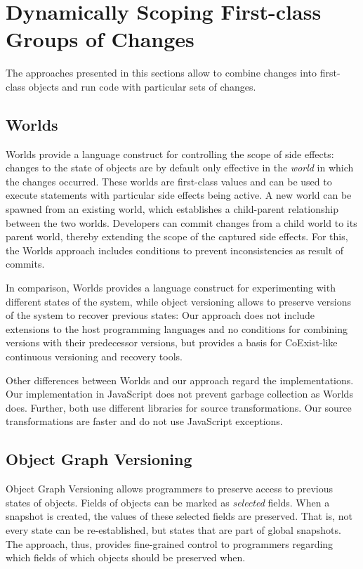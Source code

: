 \section{Dynamically Scoping First-class Groups of Changes}

The approaches presented in this sections allow to combine changes into first-class objects and run code with particular sets of changes.


\subsection{Worlds}

Worlds provide a language construct for controlling the scope of side effects: changes to the state of objects are by default only effective in the \emph{world} in which the changes occurred.
These worlds are first-class values and can be used to execute statements with particular side effects being active.
A new world can be spawned from an existing world, which establishes a child-parent relationship between the two worlds.
Developers can commit changes from a child world to its parent world, thereby extending the scope of the captured side effects.
For this, the Worlds approach includes conditions to prevent inconsistencies as result of commits.

In comparison, Worlds provides a language construct for experimenting with different states of the system, while object versioning allows to preserve versions of the system to recover previous states: Our approach does not include extensions to the host programming languages and no conditions for combining versions with their predecessor versions, but provides a basis for CoExist-like continuous versioning and recovery tools.

Other differences between Worlds and our approach regard the implementations.
Our implementation in JavaScript does not prevent garbage collection as Worlds does.
Further, both use different libraries for source transformations.
Our source transformations are faster and do not use JavaScript exceptions.


\subsection{Object Graph Versioning}

Object Graph Versioning\cite{Pluquet2009ECP} allows programmers to preserve access to previous states of objects.
Fields of objects can be marked as \emph{selected} fields.
When a snapshot is created, the values of these selected fields are preserved.
That is, not every state can be re-established, but states that are part of global snapshots. 
The approach, thus, provides fine-grained control to programmers regarding which fields of which objects should be preserved when.

